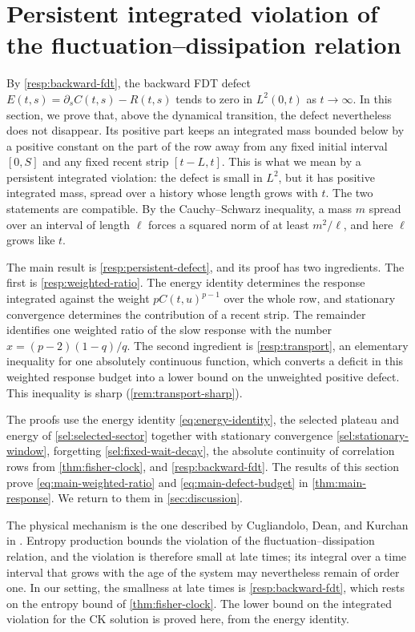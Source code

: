 \chapter{Persistent integrated violation of the fluctuation--dissipation relation}\label{resp:integrated-chapter}

By \cref{resp:backward-fdt}, the backward FDT defect $E(t,s)=\partial_sC(t,s)-R(t,s)$ tends to zero in $L^2(0,t)$ as $t\to\infty$. In this section, we prove that, above the dynamical transition, the defect nevertheless does not disappear. Its positive part keeps an integrated mass bounded below by a positive constant on the part of the row away from any fixed initial interval $[0,S]$ and any fixed recent strip $[t-L,t]$. This is what we mean by a persistent integrated violation: the defect is small in $L^2$, but it has positive integrated mass, spread over a history whose length grows with $t$. The two statements are compatible. By the Cauchy--Schwarz inequality, a mass $m$ spread over an interval of length $\ell$ forces a squared norm of at least $m^2/\ell$, and here $\ell$ grows like $t$.

The main result is \cref{resp:persistent-defect}, and its proof has two ingredients. The first is \cref{resp:weighted-ratio}. The energy identity determines the response integrated against the weight $pC(t,u)^{p-1}$ over the whole row, and stationary convergence determines the contribution of a recent strip. The remainder identifies one weighted ratio of the slow response with the number $x=(p-2)(1-q)/q$. The second ingredient is \cref{resp:transport}, an elementary inequality for one absolutely continuous function, which converts a deficit in this weighted response budget into a lower bound on the unweighted positive defect. This inequality is sharp (\cref{rem:transport-sharp}).

The proofs use the energy identity \eqref{eq:energy-identity}, the selected plateau and energy of \cref{sel:selected-sector} together with stationary convergence \eqref{sel:stationary-window}, forgetting \eqref{sel:fixed-wait-decay}, the absolute continuity of correlation rows from \cref{thm:fisher-clock}, and \cref{resp:backward-fdt}. The results of this section prove \eqref{eq:main-weighted-ratio} and \eqref{eq:main-defect-budget} in \cref{thm:main-response}. We return to them in \cref{sec:discussion}.

The physical mechanism is the one described by Cugliandolo, Dean, and Kurchan in \cite[arXiv version~2, equations~(12)--(14), p.~3, equation~(18), p.~4, and the integrated-bounds discussion on p.~3]{cdk1997}. Entropy production bounds the violation of the fluctuation--dissipation relation, and the violation is therefore small at late times; its integral over a time interval that grows with the age of the system may nevertheless remain of order one. In our setting, the smallness at late times is \cref{resp:backward-fdt}, which rests on the entropy bound of \cref{thm:fisher-clock}. The lower bound on the integrated violation for the CK solution is proved here, from the energy identity.

